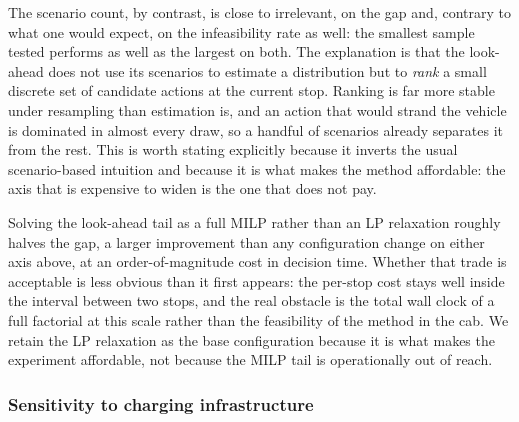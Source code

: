 The scenario count, by contrast, is close to irrelevant, on the gap and, contrary to what one would expect, on the infeasibility rate as well: the smallest sample tested performs as well as the largest on both. The explanation is that the look-ahead does not use its scenarios to estimate a distribution but to \emph{rank} a small discrete set of candidate actions at the current stop. Ranking is far more stable under resampling than estimation is, and an action that would strand the vehicle is dominated in almost every draw, so a handful of scenarios already separates it from the rest. This is worth stating explicitly because it inverts the usual scenario-based intuition and because it is what makes the method affordable: the axis that is expensive to widen is the one that does not pay.

Solving the look-ahead tail as a full MILP rather than an LP relaxation roughly halves the gap, a larger improvement than any configuration change on either axis above, at an order-of-magnitude cost in decision time. Whether that trade is acceptable is less obvious than it first appears: the per-stop cost stays well inside the interval between two stops, and the real obstacle is the total wall clock of a full factorial at this scale rather than the feasibility of the method in the cab. We retain the LP relaxation as the base configuration because it is what makes the experiment affordable, not because the MILP tail is operationally out of reach.


\subsubsection{Sensitivity to charging infrastructure}
\label{sec:sensitivity}

